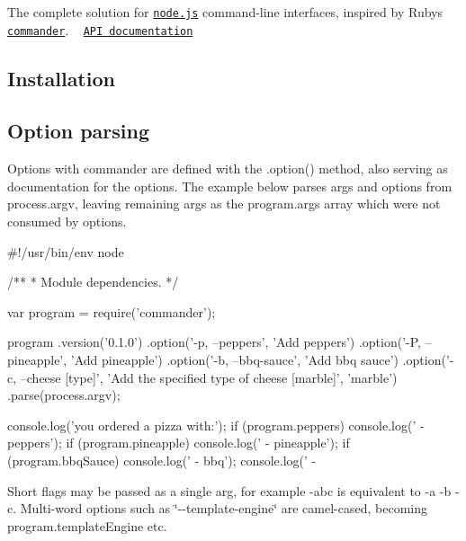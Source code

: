 \href{http://travis-ci.org/tj/commander.js}{\tt } \href{https://www.npmjs.org/package/commander}{\tt } \href{https://npmcharts.com/compare/commander?minimal=true}{\tt } \href{https://gitter.im/tj/commander.js?utm_source=badge&utm_medium=badge&utm_campaign=pr-badge&utm_content=badge}{\tt }

The complete solution for \href{http://nodejs.org}{\tt node.\+js} command-\/line interfaces, inspired by Ruby\textquotesingle{}s \href{https://github.com/commander-rb/commander}{\tt commander}. ~\newline
 \href{http://tj.github.com/commander.js/}{\tt A\+PI documentation}

\subsection*{Installation}



\subsection*{Option parsing}

Options with commander are defined with the {\ttfamily .option()} method, also serving as documentation for the options. The example below parses args and options from {\ttfamily process.\+argv}, leaving remaining args as the {\ttfamily program.\+args} array which were not consumed by options.


\begin{DoxyCode}
#!/usr/bin/env node

/**
 * Module dependencies.
 */

var program = require('commander');

program
  .version('0.1.0')
  .option('-p, --peppers', 'Add peppers')
  .option('-P, --pineapple', 'Add pineapple')
  .option('-b, --bbq-sauce', 'Add bbq sauce')
  .option('-c, --cheese [type]', 'Add the specified type of cheese [marble]', 'marble')
  .parse(process.argv);

console.log('you ordered a pizza with:');
if (program.peppers) console.log('  - peppers');
if (program.pineapple) console.log('  - pineapple');
if (program.bbqSauce) console.log('  - bbq');
console.log('  - %
\end{DoxyCode}


Short flags may be passed as a single arg, for example {\ttfamily -\/abc} is equivalent to {\ttfamily -\/a -\/b -\/c}. Multi-\/word options such as \char`\"{}-\/-\/template-\/engine\char`\"{} are camel-\/cased, becoming {\ttfamily program.\+template\+Engine} etc.

